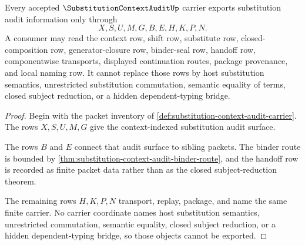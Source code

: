 \begin{theorem}
\label{thm:substitution-context-audit-nonescape}
Every accepted $\SubstitutionContextAuditUp$ carrier exports substitution audit information only through
$$
X,S,U,M,G,B,E,H,K,P,N.
$$
A consumer may read the context row, shift row, substitute row, closed-composition row, generator-closure row, binder-seal row, handoff row, componentwise transports, displayed continuation routes, package provenance, and local naming row. It cannot replace those rows by host substitution semantics, unrestricted substitution commutation, semantic equality of terms, closed subject reduction, or a hidden dependent-typing bridge.
\end{theorem}
\begin{proof}
Begin with the packet inventory of \autoref{def:substitution-context-audit-carrier}. The rows $X,S,U,M,G$ give the context-indexed substitution audit surface.

The rows $B$ and $E$ connect that audit surface to sibling packets. The binder route is bounded by \autoref{thm:substitution-context-audit-binder-route}, and the handoff row is recorded as finite packet data rather than as the closed subject-reduction theorem.

The remaining rows $H,K,P,N$ transport, replay, package, and name the same finite carrier. No carrier coordinate names host substitution semantics, unrestricted commutation, semantic equality, closed subject reduction, or a hidden dependent-typing bridge, so those objects cannot be exported.
\end{proof}


